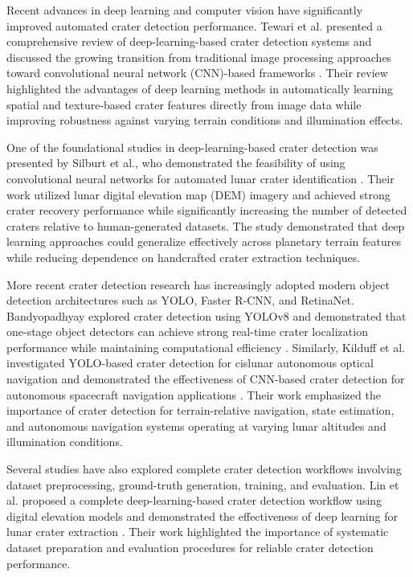\documentclass[conference]{IEEEtran}
\begin{document}
	Recent advances in deep learning and computer vision have significantly improved automated crater detection performance. Tewari et al. presented a comprehensive review of deep-learning-based crater detection systems and discussed the growing transition from traditional image processing approaches toward convolutional neural network (CNN)-based frameworks \cite{b1}. Their review highlighted the advantages of deep learning methods in automatically learning spatial and texture-based crater features directly from image data while improving robustness against varying terrain conditions and illumination effects.
	
	One of the foundational studies in deep-learning-based crater detection was presented by Silburt et al., who demonstrated the feasibility of using convolutional neural networks for automated lunar crater identification \cite{b2}. Their work utilized lunar digital elevation map (DEM) imagery and achieved strong crater recovery performance while significantly increasing the number of detected craters relative to human-generated datasets. The study demonstrated that deep learning approaches could generalize effectively across planetary terrain features while reducing dependence on handcrafted crater extraction techniques.
	
	More recent crater detection research has increasingly adopted modern object detection architectures such as YOLO, Faster R-CNN, and RetinaNet. Bandyopadhyay explored crater detection using YOLOv8 and demonstrated that one-stage object detectors can achieve strong real-time crater localization performance while maintaining computational efficiency \cite{b3}. Similarly, Kilduff et al. investigated YOLO-based crater detection for cislunar autonomous optical navigation and demonstrated the effectiveness of CNN-based crater detection for autonomous spacecraft navigation applications \cite{b9}. Their work emphasized the importance of crater detection for terrain-relative navigation, state estimation, and autonomous navigation systems operating at varying lunar altitudes and illumination conditions.
	
	Several studies have also explored complete crater detection workflows involving dataset preprocessing, ground-truth generation, training, and evaluation. Lin et al. proposed a complete deep-learning-based crater detection workflow using digital elevation models and demonstrated the effectiveness of deep learning for lunar crater extraction \cite{b4}. Their work highlighted the importance of systematic dataset preparation and evaluation procedures for reliable crater detection performance.
	
\end{document}
